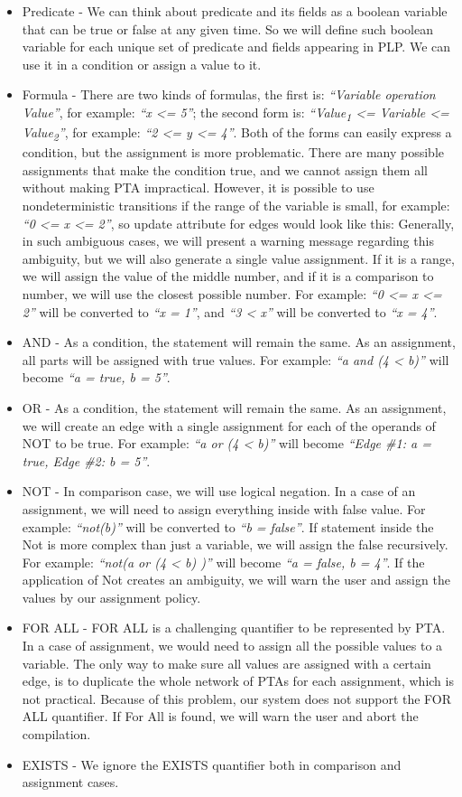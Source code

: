 \begin{itemize}
\item Predicate - We can think about predicate and its fields as a boolean variable that can be true or false at any given time. So we will define such boolean variable for each unique set of predicate and fields appearing in PLP. We can use it in a condition or assign a value to it.
\item Formula - There are two kinds of formulas, the first is: \textit{“Variable operation Value”}, for example: \textit{“x <= 5”}; the second form is: \textit{“Value\textsubscript{1} <= Variable <= Value\textsubscript{2}”}, for example: \textit{“2 <= y <= 4”}. Both of the forms can easily express a condition, but the assignment is more problematic. There are many possible assignments that make the condition true, and we cannot assign them all without making PTA impractical. However, it is possible to use nondeterministic transitions if the range of the variable is small, for example: \textit{“0 <= x <= 2”}, so update attribute for edges would look like this:    Generally, in such ambiguous cases, we will present a warning message regarding this ambiguity, but we will also generate a single value assignment. If it is a range, we will assign the value of the middle number, and if it is a comparison to number, we will use the closest possible number. For example: \textit{“0 <= x <= 2”} will be converted to \textit{“x = 1”}, and \textit{“3 < x”} will be converted to \textit{“x = 4”}.
\item AND - As a condition, the statement will remain the same. As an assignment, all parts will be assigned with true values. For example: \textit{“a and (4 < b)”} will become \textit{“a = true, b = 5”}.
\item OR - As a condition, the statement will remain the same. As an assignment, we will create an edge with a single assignment for each of the operands of NOT to be true. For example: \textit{“a or (4 < b)”} will become \textit{“Edge \#1: a = true, Edge \#2: b = 5”}.
\item NOT - In comparison case, we will use logical negation. In a case of an assignment, we will need to assign everything inside with false value. For example: \textit{“not(b)”} will be converted to \textit{“b = false”}. If statement inside the Not is more complex than just a variable, we will assign the false recursively. For example: \textit{“not(a or (4 < b) )”} will become \textit{“a = false, b = 4”}. If the application of Not creates an ambiguity, we will warn the user and assign the values by our assignment policy.
\item FOR ALL - FOR ALL is a challenging quantifier to be represented by PTA. In a case of assignment, we would need to assign all the possible values to a variable. The only way to make sure all values are assigned with a certain edge, is to duplicate the whole network of PTAs for each assignment, which is not practical. Because of this problem, our system does not support the FOR ALL quantifier. If For All is found, we will warn the user and abort the compilation.
\item EXISTS - We ignore the EXISTS quantifier both in comparison and assignment cases. 
\end{itemize}
